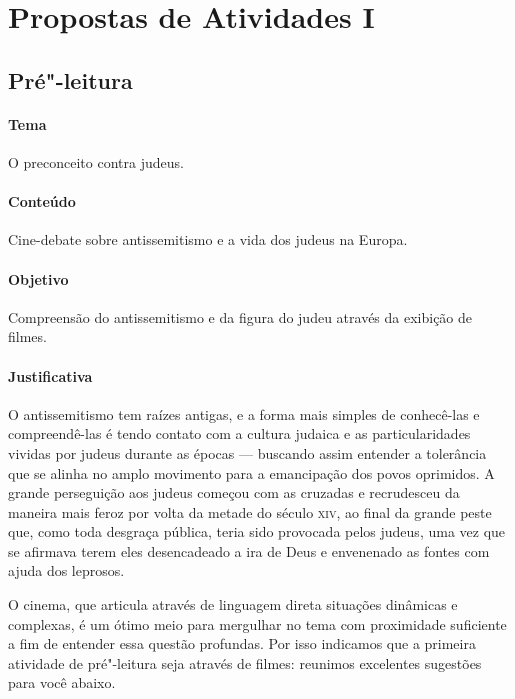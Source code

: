 \documentclass[12pt]{extarticle}
\begin{document}


\section{Propostas de Atividades I}

\subsection{Pré"-leitura}

\paragraph{Tema} O preconceito contra judeus.

\paragraph{Conteúdo} Cine-debate sobre antissemitismo e a vida 
dos judeus na Europa.

\paragraph{Objetivo} Compreensão do antissemitismo e da figura do judeu 
através da exibição de filmes.

\paragraph{Justificativa} O antissemitismo tem raízes antigas, e a forma mais simples 
de conhecê-las e compreendê-las é tendo contato com a cultura judaica e as 
particularidades vividas por judeus durante as épocas --- buscando assim entender a 
tolerância que se alinha no amplo movimento
para a emancipação dos povos oprimidos. A grande perseguição aos judeus 
começou com as cruzadas e recrudesceu da maneira mais feroz por volta 
da metade do século \textsc{xiv}, ao final da grande peste que, como toda 
desgraça pública, teria sido provocada pelos judeus, uma vez que se 
afirmava terem eles desencadeado a ira de Deus e envenenado 
as fontes com ajuda dos leprosos.

O cinema, que articula através de linguagem direta
situações dinâmicas e complexas, é um ótimo 
meio para mergulhar no tema com proximidade suficiente a fim de 
entender essa questão profundas. Por isso indicamos que a primeira 
atividade de pré"-leitura seja através de filmes: reunimos 
excelentes sugestões para você abaixo.
\end{document}
